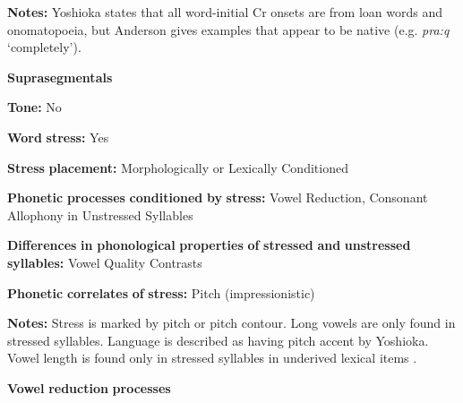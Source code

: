 \documentclass[output=paper]{langsci/langscibook}
\begin{document}
\begin{styleBody}
\textbf{Notes:} Yoshioka states that all word-initial Cr onsets are from loan words and onomatopoeia, but Anderson gives examples that appear to be native (e.g. \textit{pra:q} ‘completely’).
\end{styleBody}

\begin{styleBody}
\textbf{Suprasegmentals}
\end{styleBody}

\begin{styleBody}
\textbf{Tone:} No
\end{styleBody}

\begin{styleBody}
\textbf{Word} \textbf{stress:} Yes
\end{styleBody}

\begin{styleBody}
\textbf{Stress} \textbf{placement:} Morphologically or Lexically Conditioned
\end{styleBody}

\begin{styleBody}
\textbf{Phonetic} \textbf{processes} \textbf{conditioned} \textbf{by} \textbf{stress:} Vowel Reduction, Consonant Allophony in Unstressed Syllables
\end{styleBody}

\begin{styleBody}
\textbf{Differences} \textbf{in} \textbf{phonological} \textbf{properties} \textbf{of} \textbf{stressed} \textbf{and} \textbf{unstressed} \textbf{syllables:} Vowel Quality Contrasts
\end{styleBody}

\begin{styleBody}
\textbf{Phonetic} \textbf{correlates} \textbf{of} \textbf{stress:} Pitch (impressionistic)
\end{styleBody}

\begin{styleBody}
\textbf{Notes:} Stress is marked by pitch or pitch contour. Long vowels are only found in stressed syllables. Language is described as having pitch accent by Yoshioka. Vowel length is found only in stressed syllables in underived lexical items \citep{Anderson1028}.
\end{styleBody}

\begin{styleBody}
\textbf{Vowel} \textbf{reduction} \textbf{processes}
\end{styleBody}
\end{document}
